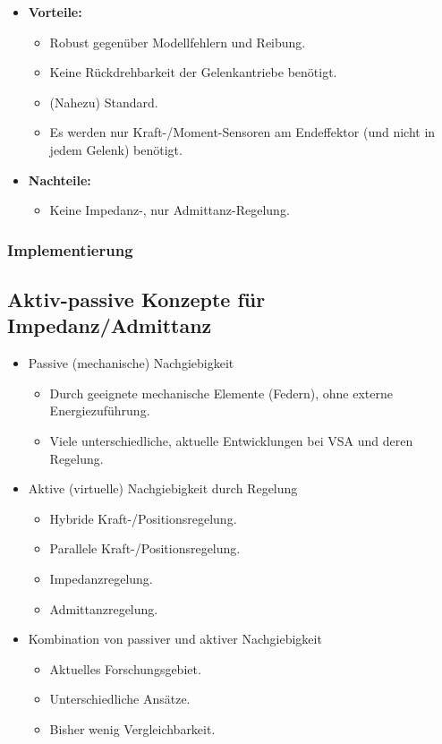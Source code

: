 			\begin{itemize}
				\item \textbf{Vorteile:}
					\begin{itemize}
						\item Robust gegenüber Modellfehlern und Reibung.
						\item Keine Rückdrehbarkeit der Gelenkantriebe benötigt.
						\item (Nahezu) Standard.
						\item Es werden nur Kraft-/Moment-Sensoren am Endeffektor (und nicht in jedem Gelenk) benötigt.
					\end{itemize}
				\item \textbf{Nachteile:}
					\begin{itemize}
						\item Keine Impedanz-, nur Admittanz-Regelung.
					\end{itemize}
			\end{itemize}

			\subsubsection{Implementierung} %

		\subsection{Aktiv-passive Konzepte für Impedanz/Admittanz}
			\begin{itemize}
				\item Passive (\bzw mechanische) Nachgiebigkeit
					\begin{itemize}
						\item Durch geeignete mechanische Elemente (\zB Federn), ohne externe Energiezuführung.
						\item Viele unterschiedliche, aktuelle Entwicklungen bei VSA und deren Regelung.
					\end{itemize}
				\item Aktive (\bzw virtuelle) Nachgiebigkeit durch Regelung
					\begin{itemize}
						\item Hybride Kraft-/Positionsregelung.
						\item Parallele Kraft-/Positionsregelung.
						\item Impedanzregelung.
						\item Admittanzregelung.
					\end{itemize}
				\item Kombination von passiver und aktiver Nachgiebigkeit
					\begin{itemize}
						\item Aktuelles Forschungsgebiet.
						\item Unterschiedliche Ansätze.
						\item Bisher wenig Vergleichbarkeit.
					\end{itemize}
			\end{itemize}

